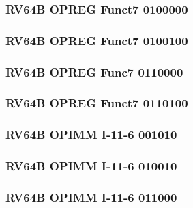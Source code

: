 \subsubsection[{\small RV64B OPREG Funct7 0100000}]{RV64B OPREG Funct7 0100000} \label{sec:format-RV64B-OPREG-0x20}



\subsubsection[{\small RV64B OPREG Funct7 0100100}]{RV64B OPREG Funct7 0100100} \label{sec:format-RV64B-OPREG-0x24}



\subsubsection[{\small RV64B OPREG Func7 0110000}]{RV64B OPREG Func7 0110000} \label{sec:format-RV64B-OPREG-0x30}



\subsubsection[{\small RV64B OPREG Funct7 0110100}]{RV64B OPREG Funct7 0110100} \label{sec:format-RV64B-OPREG-0x34}



\subsubsection[{\small RV64B OPIMM I-11-6 001010}]{RV64B OPIMM I-11-6 001010} \label{sec:format-RV64B-OPIMM-0x0a}



\subsubsection[{\small RV64B OPIMM I-11-6 010010}]{RV64B OPIMM I-11-6 010010} \label{sec:format-RV64B-OPIMM-0x12}



\subsubsection[{\small RV64B OPIMM I-11-6 011000}]{RV64B OPIMM I-11-6 011000} \label{sec:format-RV64B-OPIMM-0x18}

